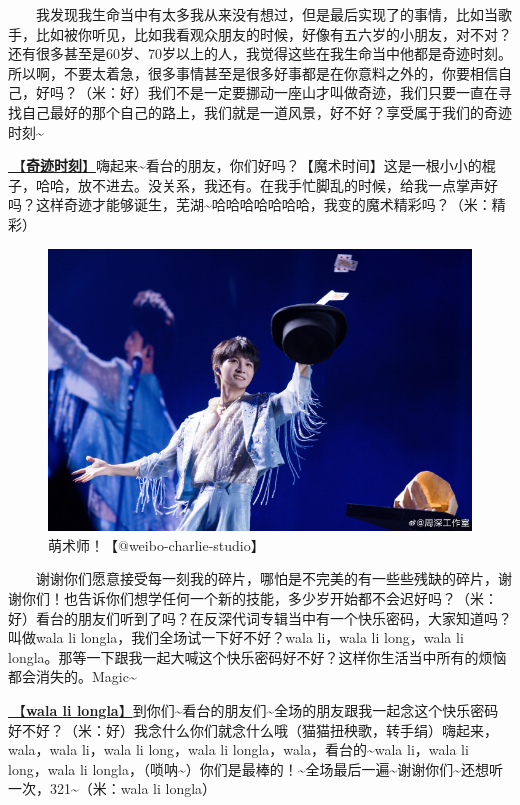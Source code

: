 \documentclass[]{ctexbook}
\begin{document}
  我发现我生命当中有太多我从来没有想过，但是最后实现了的事情，比如当歌手，比如被你听见，比如我看观众朋友的时候，好像有五六岁的小朋友，对不对？还有很多甚至是60岁、70岁以上的人，我觉得这些在我生命当中他都是奇迹时刻。所以啊，不要太着急，很多事情甚至是很多好事都是在你意料之外的，你要相信自己，好吗？（米：好）我们不是一定要挪动一座山才叫做奇迹，我们只要一直在寻找自己最好的那个自己的路上，我们就是一道风景，好不好？享受属于我们的奇迹时刻\textasciitilde{}

\hyperref[magic-moment]{🎵【\textbf{奇迹时刻}】}嗨起来\textasciitilde 看台的朋友，你们好吗？【魔术时间】这是一根小小的棍子，哈哈，放不进去。没关系，我还有。在我手忙脚乱的时候，给我一点掌声好吗？这样奇迹才能够诞生，芜湖\textasciitilde 哈哈哈哈哈哈哈，我变的魔术精彩吗？（米：精彩）

\begin{figure}

{\centering \includegraphics[width=400pt]{img/shenyang20240907/001} 

}

\caption{萌术师！【@weibo-charlie-studio】}\label{fig:unnamed-chunk-94}
\end{figure}

  谢谢你们愿意接受每一刻我的碎片，哪怕是不完美的有一些些残缺的碎片，谢谢你们！也告诉你们想学任何一个新的技能，多少岁开始都不会迟好吗？（米：好）看台的朋友们听到了吗？在反深代词专辑当中有一个快乐密码，大家知道吗？叫做wala li longla，我们全场试一下好不好？wala li，wala li long，wala li longla。那等一下跟我一起大喊这个快乐密码好不好？这样你生活当中所有的烦恼都会消失的。Magic\textasciitilde{}

\hyperref[wala-li-longla]{🎵【\textbf{wala li longla}】}到你们\textasciitilde 看台的朋友们\textasciitilde 全场的朋友跟我一起念这个快乐密码好不好？（米：好）我念什么你们就念什么哦（猫猫扭秧歌，转手绢）嗨起来，wala，wala li，wala li long，wala li longla，wala，看台的\textasciitilde wala li，wala li long，wala li longla，（唢呐\textasciitilde）你们是最棒的！\textasciitilde 全场最后一遍\textasciitilde 谢谢你们\textasciitilde 还想听一次，321\textasciitilde（米：wala li longla）
\end{document}
